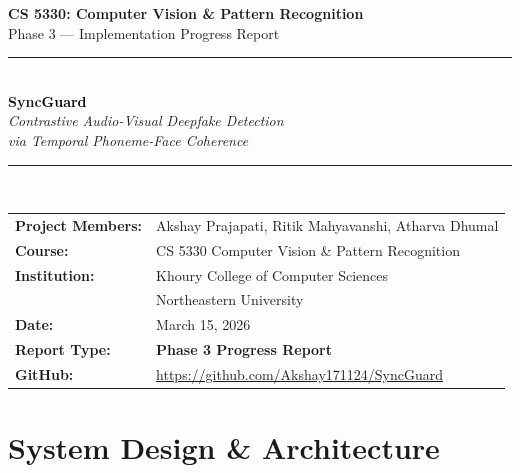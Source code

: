 \documentclass[12pt, letterpaper]{article}
\begin{document}

\begin{titlepage}
  \centering
  \vspace*{1.8cm}

  {\LARGE \textbf{CS 5330: Computer Vision \& Pattern Recognition}}\\[0.4cm]
  {\large Phase 3 — Implementation Progress Report}\\[1.4cm]

  \noindent\rule{\linewidth}{1.5pt}\\[0.5cm]
  {\Huge \textbf{\textcolor{accent}{Sync}\textcolor{black}{Guard}}}\\[0.4cm]
  {\Large \textit{Contrastive Audio-Visual Deepfake Detection\\[0.2cm]
  via Temporal Phoneme-Face Coherence}}\\[0.5cm]
  \noindent\rule{\linewidth}{1.5pt}\\[1.8cm]

  \begin{tabular}{ll}
    \textbf{Project Members:} & Akshay Prajapati, Ritik Mahyavanshi, Atharva Dhumal \\[0.4cm]
    \textbf{Course:}          & CS 5330 Computer Vision \& Pattern Recognition \\[0.4cm]
    \textbf{Institution:}     & Khoury College of Computer Sciences \\
                              & Northeastern University \\[0.4cm]
    \textbf{Date:}            & March 15, 2026 \\[0.4cm]
    \textbf{Report Type:}     & \textbf{Phase 3 Progress Report} \\[0.4cm]
    \textbf{GitHub:}          & \url{https://github.com/Akshay171124/SyncGuard} \\
  \end{tabular}

  \vfill
\end{titlepage}

\tableofcontents
\newpage

\section{System Design \& Architecture}
\end{document}
